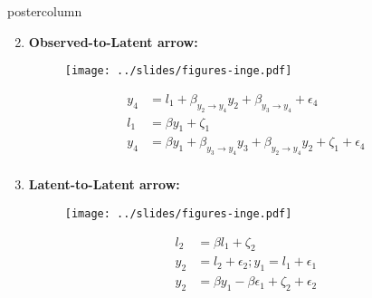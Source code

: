 \documentclass{beamer}
\newlength{\columnheight}
\begin{document}
\begin{frame}
\begin{columns}
	\begin{column}{.33\textwidth}
 		\begin{beamercolorbox}[center]{postercolumn}
 			\begin{minipage}{.98\textwidth} %
 				\parbox[t][\columnheight]{\textwidth}{ %
					\begin{myblock}{}
						\begin{enumerate}
							\setcounter{enumi}{1}
							\item \textbf{Observed-to-Latent arrow:}
								\begin{figure}
									\centering
									\texttt{[image: ../slides/figures-inge.pdf]}
									\label{fig:l2o_obs_lat}
								\end{figure}
								\begin{equation*}
									\begin{split}
										y_4 &= l_1 + \beta_{y_2 \to y_4} y_2 + \beta_{y_3 \to y_4} + \epsilon_4 \\
										l_1 &= \beta y_1 + \zeta_1 \\
										y_4 &= \beta y_1 + \beta_{y_3 \to y_4} y_3 + \beta_{y_2 \to y_4} y_2 + \zeta_1 + \epsilon_4 \\
									\end{split}
								\end{equation*}
							\vspace{0.9em}	
							\item \textbf{Latent-to-Latent arrow:}
								\begin{figure}
									\centering
									\texttt{[image: ../slides/figures-inge.pdf]}
									\label{fig:l2o_lat_lat}
								\end{figure}
								\begin{equation*}
									\begin{split}
										l_2 &= \beta l_1 + \zeta_2 \\
										y_2 &= l_2 + \epsilon_2; y_1 = l_1 + \epsilon_1 \\
										y_2 &= \beta y_1 - \beta \epsilon_1 + \zeta_2 + \epsilon_2
									\end{split}
								\end{equation*}
						\end{enumerate}
					\end{myblock}\vfill
					\begin{myblock}{}

\end{myblock}}
\end{minipage}
\end{beamercolorbox}
\end{column}
\end{columns}
\end{frame}
\end{document}
